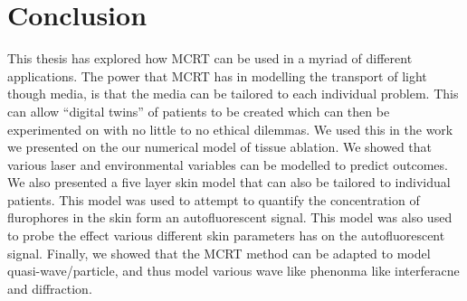 \section*{Conclusion}

This thesis has explored how MCRT can be used in a myriad of different applications. 
The power that MCRT has in modelling the transport of light though media, is that the media can be tailored to each individual problem.
This can allow ``digital twins'' of patients to be created which can then be experimented on with no little to no ethical dilemmas.
We used this in the work we presented on the our numerical model of tissue ablation.
We showed that various laser and environmental variables can be modelled to predict outcomes.
We also presented a five layer skin model that can also be tailored to individual patients.
This model was used to attempt to quantify the concentration of flurophores in the skin form an autofluorescent signal.
This model was also used to probe the effect various different skin parameters has on the autofluorescent signal.
Finally, we showed that the MCRT method can be adapted to model quasi-wave/particle, and thus model various wave like phenonma like interferacne and diffraction.

